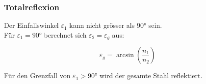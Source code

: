 \subsubsection{Totalreflexion}

Der Einfallswinkel $\varepsilon_1$ kann nicht grösser als 90° sein. \\
Für $\varepsilon_1 = 90$° berechnet sich $\varepsilon_2 = \varepsilon_g$ aus: 


$$ \boxed{\varepsilon_g = \arcsin \left( \frac{n_1}{n_2} \right)} $$


Für den Grenzfall von $\varepsilon_1 > 90$° wird der gesamte Stahl reflektiert. \\



